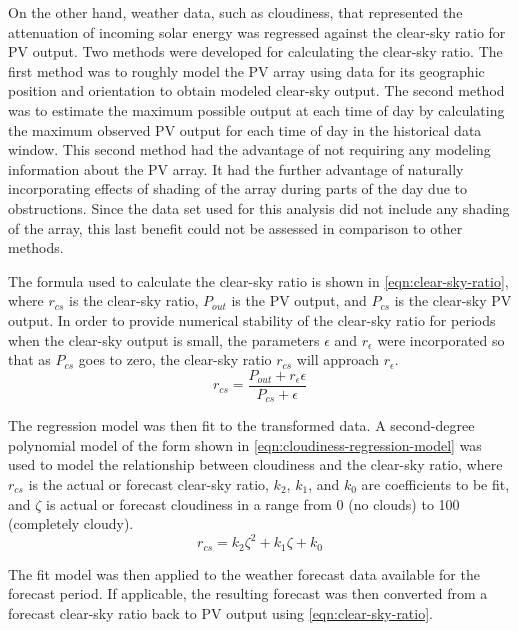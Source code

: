 On the other hand, weather data, such as cloudiness, that represented the attenuation of incoming solar energy was regressed against the clear-sky ratio for PV output.
Two methods were developed for calculating the clear-sky ratio.
The first method was to roughly model the PV array using data for its geographic position and orientation to obtain modeled clear-sky output.
The second method was to estimate the maximum possible output at each time of day by calculating the maximum observed PV output for each time of day in the historical data window.
This second method had the advantage of not requiring any modeling information about the PV array.
It had the further advantage of naturally incorporating effects of shading of the array during parts of the day due to obstructions.
Since the data set used for this analysis did not include any shading of the array, this last benefit could not be assessed in comparison to other methods.

The formula used to calculate the clear-sky ratio is shown in \cref{eqn:clear-sky-ratio},
where $r_{cs}$ is the clear-sky ratio, $P_{out}$ is the PV output, and $P_{cs}$ is the clear-sky PV output.
In order to provide numerical stability of the clear-sky ratio for periods when the clear-sky output is small, the parameters $\epsilon$ and $r_\epsilon$ were incorporated so that as $P_{cs}$ goes to zero, the clear-sky ratio $r_{cs}$ will approach $r_\epsilon$.
%
\begin{equation}
	\label{eqn:clear-sky-ratio}
	r_{cs} = \frac{P_{out} + r_\epsilon \epsilon}{P_{cs} + \epsilon}
\end{equation}

The regression model was then fit to the transformed data.
A second-degree polynomial model of the form shown in \cref{eqn:cloudiness-regression-model} was used to model the relationship between cloudiness and the clear-sky ratio, where
$r_{cs}$ is the actual or forecast clear-sky ratio,
$k_2$, $k_1$, and $k_0$ are coefficients to be fit, and
$\zeta$ is actual or forecast cloudiness in a range from 0 (no clouds) to 100 (completely cloudy).
%
\begin{equation}
	\label{eqn:cloudiness-regression-model}
	r_{cs} = k_2 \zeta^2 + k_1 \zeta + k_0
\end{equation}

The fit model was then applied to the weather forecast data available for the forecast period.
If applicable, the resulting forecast was then converted from a forecast clear-sky ratio back to PV output using \cref{eqn:clear-sky-ratio}.

